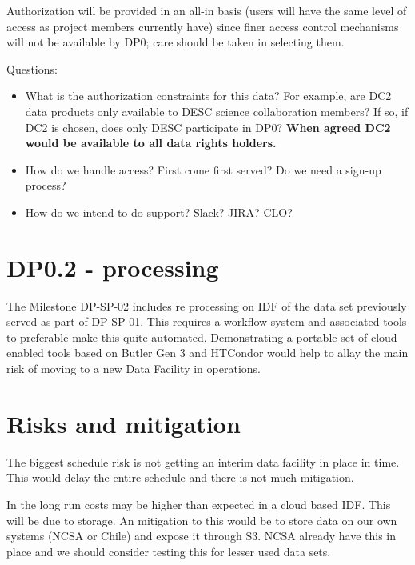 Authorization will be provided in an all-in basis (users will have the same level of access as project members currently have) since finer access control mechanisms will not be available by DP0; care should be taken in selecting them.

Questions:

\begin{itemize}

\item What is the authorization constraints for this data? For example, are DC2 data products only available to DESC science collaboration members? If so, if DC2 is chosen, does only DESC participate in DP0?
	{\bf When agreed DC2 would be available to all data rights holders.}

\item How do we handle access? First come first served? Do we need a sign-up process?

\item How do we intend to do support? Slack? JIRA? CLO?

\end{itemize}

\section{DP0.2 - processing}
The Milestone DP-SP-02 includes re processing on IDF of the data set previously served as part of DP-SP-01.
This requires a workflow system and associated tools to preferable make this quite automated.
Demonstrating a portable set of cloud enabled tools based on Butler Gen 3 and HTCondor would help to allay the main risk of moving to a new Data Facility in operations.

\section{Risks and mitigation}

The biggest schedule risk is not getting an interim data facility in place in time.
This would delay the entire schedule and there is not much mitigation.

In the long run costs may be higher than expected in a cloud based IDF. This will be due to storage.
An mitigation to this would be to store data on our own systems (NCSA or Chile) and expose it through S3.
NCSA already have this in place and we should consider testing this for lesser used data sets.

